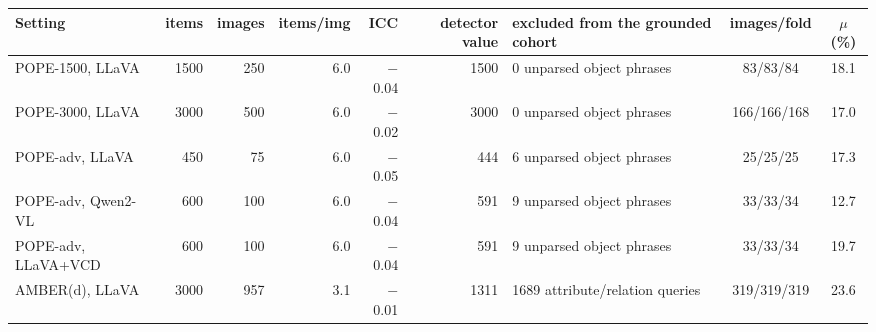 \begin{tabular}{lrrrrrlcc}
\toprule
Setting & items & images & items/img & ICC & detector value & excluded from the grounded cohort & images/fold & $\mu$ (\%)\\
\midrule
POPE-1500, LLaVA & 1500 & 250 & 6.0 & $-$0.04 & 1500 & 0 unparsed object phrases & 83/83/84 & 18.1\\
POPE-3000, LLaVA & 3000 & 500 & 6.0 & $-$0.02 & 3000 & 0 unparsed object phrases & 166/166/168 & 17.0\\
POPE-adv, LLaVA & 450 & 75 & 6.0 & $-$0.05 & 444 & 6 unparsed object phrases & 25/25/25 & 17.3\\
POPE-adv, Qwen2-VL & 600 & 100 & 6.0 & $-$0.04 & 591 & 9 unparsed object phrases & 33/33/34 & 12.7\\
POPE-adv, LLaVA+VCD & 600 & 100 & 6.0 & $-$0.04 & 591 & 9 unparsed object phrases & 33/33/34 & 19.7\\
AMBER(d), LLaVA & 3000 & 957 & 3.1 & $-$0.01 & 1311 & 1689 attribute/relation queries & 319/319/319 & 23.6\\
\bottomrule
\end{tabular}
